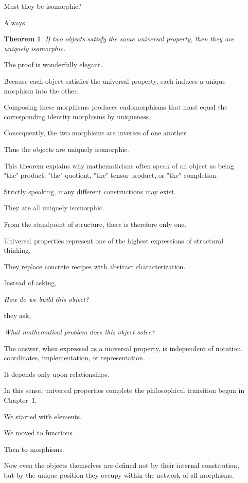 \documentclass[11pt]{book}
\numberwithin{equation}{chapter}
\theoremstyle{definition}
\theoremstyle{plain}
\newtheorem{theorem}[definition]{Theorem}
\theoremstyle{remark}
\begin{document}
Must they be isomorphic?

Always.

\begin{theorem}

If two objects satisfy the same universal property, then they are uniquely isomorphic.

\end{theorem}

The proof is wonderfully elegant.

Because each object satisfies the universal property, each induces a unique morphism into the other.

Composing these morphisms produces endomorphisms that must equal the corresponding identity morphisms by uniqueness.

Consequently, the two morphisms are inverses of one another.

Thus the objects are uniquely isomorphic.

This theorem explains why mathematicians often speak of an object as being "the" product, "the" quotient, "the" tensor product, or "the" completion.

Strictly speaking, many different constructions may exist.

They are all uniquely isomorphic.

From the standpoint of structure, there is therefore only one.

Universal properties represent one of the highest expressions of structural thinking.

They replace concrete recipes with abstract characterization.

Instead of asking,

\emph{How do we build this object?}

they ask,

\emph{What mathematical problem does this object solve?}

The answer, when expressed as a universal property, is independent of notation, coordinates, implementation, or representation.

It depends only upon relationships.

In this sense, universal properties complete the philosophical transition begun in Chapter~1.

We started with elements.

We moved to functions.

Then to morphisms.

Now even the objects themselves are defined not by their internal constitution, but by the unique position they occupy within the network of all morphisms.
\end{document}
